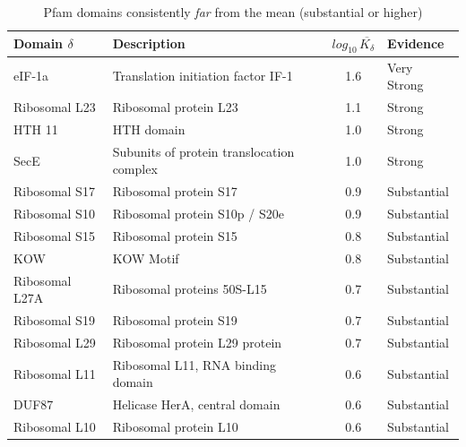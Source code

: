 \documentclass[12pt]{article}
\begin{document}
\begin{table}[!h]
	\centering
	\hspace*{-1.2cm}
    \begin{tabular}{l l c l}
        \toprule
        Domain $\delta$ & Description & $log_{10}\,\overline{K_{\delta}}$ & Evidence \\
        \midrule
        eIF-1a & Translation initiation factor IF-1 & 1.6 & Very Strong \\
        Ribosomal L23 & Ribosomal protein L23 & 1.1 & Strong \\
        HTH 11 & HTH domain & 1.0 & Strong \\
        SecE & Subunits of protein translocation complex & 1.0 & Strong \\
        Ribosomal S17 & Ribosomal protein S17 & 0.9 & Substantial \\
        Ribosomal S10 & Ribosomal protein S10p / S20e & 0.9 & Substantial \\
        Ribosomal S15 & Ribosomal protein S15 & 0.8 & Substantial \\
        KOW & KOW Motif & 0.8 & Substantial \\
        Ribosomal L27A & Ribosomal proteins 50S-L15 & 0.7 & Substantial \\
        Ribosomal S19 & Ribosomal protein S19 & 0.7 & Substantial \\
        Ribosomal L29 & Ribosomal protein L29 protein & 0.7 & Substantial \\
        Ribosomal L11 & Ribosomal L11, RNA binding domain & 0.6 & Substantial \\
        DUF87 & Helicase HerA, central domain & 0.6 & Substantial \\
        Ribosomal L10 & Ribosomal protein L10 & 0.6 & Substantial \\
        \bottomrule
    \end{tabular}
    \caption{Pfam domains consistently \textit{far} from the mean (substantial or higher)}
    \label{table:pfam_right_overall}
\end{table}

\pagebreak
\end{document}
